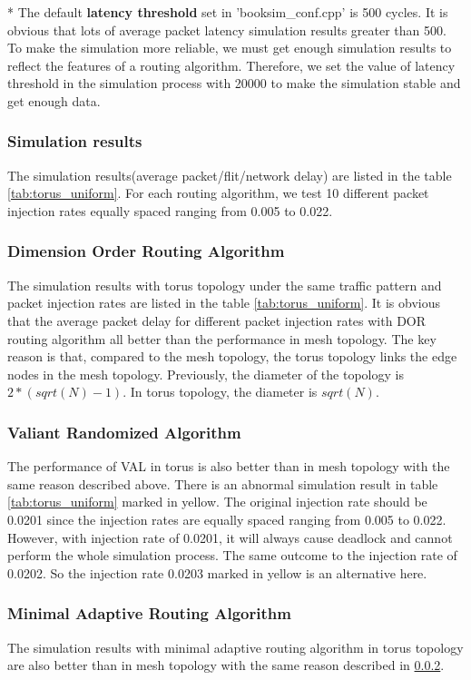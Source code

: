 * The default \textbf{latency threshold} set in 'booksim\_conf.cpp' is 500 cycles. It is obvious that lots of average packet latency simulation results greater than 500. To make the simulation more reliable, we must get enough simulation results to reflect the features of a routing algorithm. Therefore, we set the value of latency threshold in the simulation process with 20000 to make the simulation stable and get enough data.


\subsubsection{Simulation results}
The simulation results(average packet/flit/network delay) are listed in the table \ref{tab:torus_uniform}. For each routing algorithm, we test 10 different packet injection rates equally spaced ranging from 0.005 to 0.022.

\subsubsection{Dimension Order Routing Algorithm}
\label{sec:torus_dor}
The simulation results with torus topology under the same traffic pattern and packet injection rates are listed in the table \ref{tab:torus_uniform}. It is obvious that the average packet delay for different packet injection rates with DOR routing algorithm all better than the performance in mesh topology. The key reason is that, compared to the mesh topology, the torus topology links the edge nodes in the mesh topology. Previously, the diameter of the topology is $2*(sqrt(N)-1)$. In torus topology, the diameter is $sqrt(N)$.

\subsubsection{Valiant Randomized Algorithm}
The performance of VAL in torus is also better than in mesh topology with the same reason described above. There is an abnormal simulation result in table \ref{tab:torus_uniform} marked in yellow. The original injection rate should be 0.0201 since the injection rates are equally spaced ranging from 0.005 to 0.022. However, with injection rate of 0.0201, it will always cause deadlock and cannot perform the whole simulation process. The same outcome to the injection rate of 0.0202. So the injection rate 0.0203 marked in yellow is an alternative here.

\subsubsection{Minimal Adaptive Routing Algorithm}
The simulation results with minimal adaptive routing algorithm in torus topology are also better than in mesh topology with the same reason described in \ref{sec:torus_dor}.

